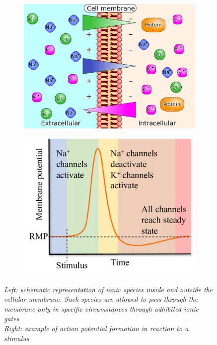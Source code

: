 \documentclass[a4paper]{article}
\begin{document}
\begin{figure}[H]
	\begin{minipage}{\linewidth}
		\centering
		\begin{minipage}{0.45\linewidth}
			\begin{figure}[H]
				\includegraphics[width=\linewidth]{AP1.png}
				
			\end{figure}
		\end{minipage}
		\hspace{0.05\linewidth}
		\begin{minipage}{0.45\linewidth}
			\begin{figure}[H]
				\includegraphics[width=\linewidth]{AP2.png}
				
			\end{figure}
		\end{minipage}
		
	\end{minipage}
\caption{\textit{Left: schematic representation of ionic species inside and outside the cellular membrane. Such species are allowed to pass through the membrane only in specific circumstances through adhibited ionic gates \\
Right: example of action potential formation in reaction to a stimulus}}
\end{figure}
\end{document}
